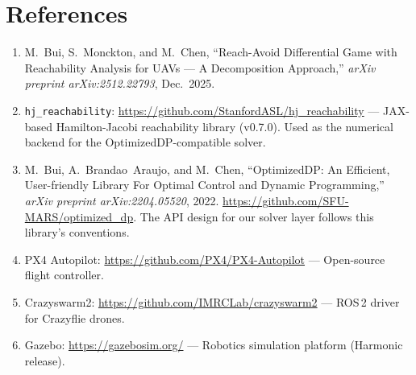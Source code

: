 \documentclass[11pt,a4paper]{article}
\begin{document}
\section{References}

\begin{enumerate}
    \item M.~Bui, S.~Monckton, and M.~Chen, ``Reach-Avoid Differential Game with Reachability Analysis for UAVs --- A Decomposition Approach,'' \textit{arXiv preprint arXiv:2512.22793}, Dec.~2025.

    \item \texttt{hj\_reachability}: \url{https://github.com/StanfordASL/hj_reachability} --- JAX-based Hamilton-Jacobi reachability library (v0.7.0). Used as the numerical backend for the OptimizedDP-compatible solver.

    \item M.~Bui, A.~Brandao~Araujo, and M.~Chen, ``OptimizedDP: An Efficient, User-friendly Library For Optimal Control and Dynamic Programming,'' \textit{arXiv preprint arXiv:2204.05520}, 2022. \url{https://github.com/SFU-MARS/optimized_dp}. The API design for our solver layer follows this library's conventions.

    \item PX4 Autopilot: \url{https://github.com/PX4/PX4-Autopilot} --- Open-source flight controller.

    \item Crazyswarm2: \url{https://github.com/IMRCLab/crazyswarm2} --- ROS\,2 driver for Crazyflie drones.

    \item Gazebo: \url{https://gazebosim.org/} --- Robotics simulation platform (Harmonic release).
\end{enumerate}
\end{document}
